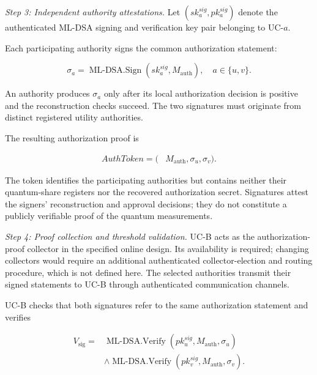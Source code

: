 \documentclass[twocolumn,10pt,journal]{IEEEtran}
\begin{document}
\textit{Step 3: Independent authority attestations.}
Let $(sk_a^{sig},pk_a^{sig})$ denote the
authenticated ML-DSA signing and verification
key pair belonging to UC-$a$.

Each participating authority signs the common
authorization statement:

\begin{equation}
\sigma_a
=
\operatorname{ML\mbox{-}DSA.Sign}
\left(
sk_a^{sig},M_{\mathrm{auth}}
\right),
\quad a\in\{u,v\}.
\label{eq:qsv2g_authority_signature}
\end{equation}

An authority produces $\sigma_a$ only after
its local authorization decision is positive
and the reconstruction checks succeed.
The two signatures must originate from
distinct registered utility authorities.

The resulting authorization proof is

\begin{equation}
\begin{aligned}
AuthToken=
(&M_{\mathrm{auth}},
\sigma_u,\sigma_v).
\end{aligned}
\label{eq:qsv2g_auth_token}
\end{equation}

The token identifies the participating
authorities but contains neither their
quantum-share registers nor the recovered
authorization secret. Signatures attest the signers' reconstruction
and approval decisions; they do not constitute a publicly
verifiable proof of the quantum measurements.

\textit{Step 4: Proof collection and threshold validation.}
UC-B acts as the authorization-proof collector in the specified
online design. Its availability is required; changing collectors
would require an additional authenticated collector-election and
routing procedure, which is not defined here.
The selected authorities transmit their signed
statements to UC-B through authenticated
communication channels.

UC-B checks that both signatures refer to
the same authorization statement and verifies

\begin{equation}
\begin{aligned}
V_{\mathrm{sig}}
={}&
\operatorname{ML\mbox{-}DSA.Verify}
(pk_u^{sig},M_{\mathrm{auth}},\sigma_u)\\
&\land
\operatorname{ML\mbox{-}DSA.Verify}
(pk_v^{sig},M_{\mathrm{auth}},\sigma_v).
\end{aligned}
\label{eq:qsv2g_authorization_signatures_verify}
\end{equation}
\end{document}
